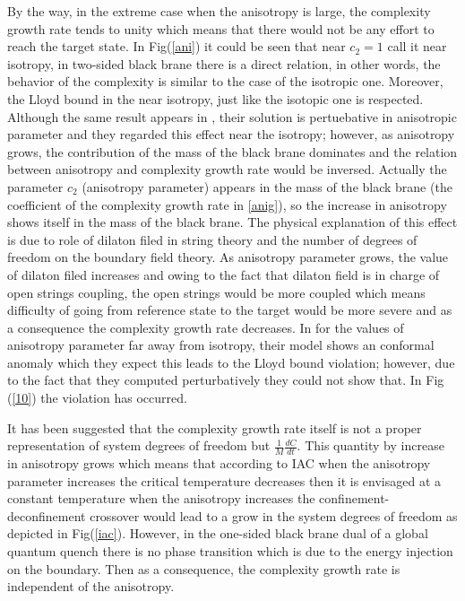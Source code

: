 \documentclass[]{article}
\begin{document}
By the way, in the extreme case when the anisotropy is large, the complexity growth rate tends to unity which means that there would not be any effort to reach the target state. In Fig(\ref{ani}) it could be seen that near $c_2=1$ call it near isotropy, in two-sided black brane there is a direct relation, in other words, the behavior of the complexity is similar to the case of the isotropic one. Moreover, the Lloyd bound in the near isotropy, just like the isotopic one is respected. Although the same result appears in  \cite{seyed}, their solution is pertuebative in anisotropic parameter and they regarded this effect near the isotropy; however, as anisotropy grows, the contribution of the mass of the black brane dominates and the relation between anisotropy and complexity growth rate would be inversed. Actually the parameter $c_2$ (anisotropy parameter) appears in the mass of the black brane (the coefficient of the complexity growth rate in \eqref{anig}), so the increase in anisotropy shows itself in the mass of the black brane. The physical explanation of this effect is due to role of dilaton filed in string theory and the number of degrees of freedom on the boundary field theory. As anisotropy parameter grows, the value of dilaton filed increases and owing to the fact that dilaton field is in charge of open strings coupling, the open strings would be more coupled which means difficulty of going from reference state to the target would be more severe and as a consequence the complexity growth rate decreases. In \cite{seyed} for the values of anisotropy parameter far away from isotropy, their model shows an conformal anomaly which they expect this leads to the Lloyd bound violation; however, due to the fact that they computed perturbatively they could not show that. In Fig (\ref{10}) the violation has occurred.



It has been suggested that the complexity growth rate itself is not a proper representation of system degrees of freedom but $\frac{1}{M}\frac{dC}{dt}$. This quantity by increase in anisotropy grows which means that according to IAC when the anisotropy parameter increases the critical temperature decreases then it is envisaged at a constant temperature when the anisotropy increases the confinement-deconfinement crossover would lead to a grow in the system degrees of freedom as depicted in Fig(\ref{iac}). However, in the one-sided black brane dual of a global quantum quench there is no phase transition which is due to the energy injection on the boundary. Then as a consequence, the complexity growth rate is independent of the anisotropy.
\end{document}

